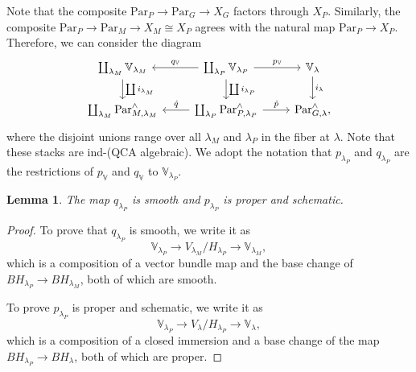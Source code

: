 \documentclass{amsart}
\newtheorem{lemma}[theorem]{Lemma}
\theoremstyle{definition}
\theoremstyle{remark}
\numberwithin{equation}{section}
\newcommand{\Par}{\mathrm{Par}}
\newcommand{\V}{\mathbb{V}}
\begin{document}
Note that the composite $\Par_P \to \Par_G \to X_G$ factors through $X_P$. Similarly, the composite $\Par_P\to \Par_M \to X_M\cong X_P$ agrees with the natural map $\Par_P\to X_P$. Therefore, we can consider the diagram
\begin{equation*}
    \begin{tikzcd}
                \coprod_{\lambda_M} \V_{\lambda_M} \arrow[d, "\coprod i_{\lambda_M}"] & \coprod_{\lambda_{P}} \V_{\lambda_{P}} \arrow[l, swap, "q_{\V}"] \arrow[r, "p_\V"] \arrow[d, "\coprod i_{\lambda_P}"] & \V_{\lambda} \arrow[d, " i_{\lambda}"] \\ 
                \coprod_{\lambda_M} \Par^{\wedge}_{M, \lambda_M} & \coprod_{\lambda_{P}} \Par^{\wedge}_{P, \lambda_{P}} \arrow[l, swap, "\hat{q}"] \arrow[r, "\hat{p}"]  & \Par^{\wedge}_{G, \lambda}, 
    \end{tikzcd}
\end{equation*}
where the disjoint unions range over all $\lambda_M$ and $\lambda_{P}$ in the fiber at $\lambda$. Note that these stacks are ind-(QCA algebraic). We adopt the notation that $p_{\lambda_P}$ and $q_{\lambda_P}$ are the restrictions of $p_{\V}$ and $q_{\V}$ to $\V_{\lambda_P}$. 
\begin{lemma}{\label{lem: propersmooth}}
    The map $q_{\lambda_P}$ is smooth and $p_{\lambda_P}$ is proper and schematic.
\end{lemma}
\begin{proof}
    To prove that $q_{\lambda_P}$ is smooth, we write it as
    \begin{equation*}
        \V_{\lambda_P} \rightarrow V_{\lambda_M}/H_{\lambda_P} \rightarrow \V_{\lambda_M},
    \end{equation*}
which is a composition of a vector bundle map and the base change of $BH_{\lambda_P} \rightarrow BH_{\lambda_M}$, both of which are smooth.

To prove $p_{\lambda_P}$ is proper and schematic, we write it as
\begin{equation*}
    \V_{\lambda_P} \rightarrow V_{\lambda}/H_{\lambda_P} \rightarrow \V_{\lambda},
\end{equation*}
which is a composition of a closed immersion and a base change of the map $BH_{\lambda_P} \rightarrow BH_{\lambda}$, both of which are proper.
\end{proof}
\end{document}
